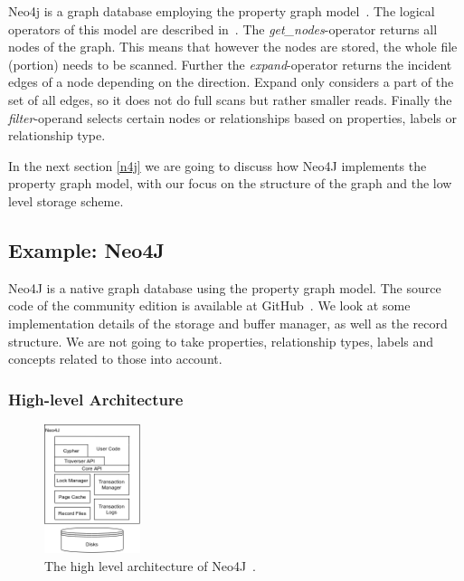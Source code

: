         
        Neo4j is a graph database employing the property graph model~\cite{robinson2015graph}.
        The logical operators of this model are described in~\autocite{Holsch2016Algeb}. 
        The \textit{get\_nodes}-operator returns all nodes of the graph.
        This means that however the nodes are stored, the whole file (portion) needs to be scanned.
        Further the \textit{expand}-operator returns the incident edges of a node depending on the direction.
        Expand only considers a part of the set of all edges, so it does not do full scans but rather smaller reads.
        Finally the \textit{filter}-operand selects certain nodes or relationships based on properties, labels or relationship type.
        
        In the next section \ref{n4j} we are going to discuss how Neo4J implements the property graph model, with our focus on the structure of the graph and the low level storage scheme.

    \subsection*{Example: Neo4J}\label{n4j}
        Neo4J is a native graph database using the property graph model.
        The source code of the community edition is available at GitHub~\autocite{GitHubneo4j}.
        We look at some implementation details of the storage and buffer manager, as well as the record structure.
        We are not going to take properties, relationship types, labels and concepts related to those into account.
        
        \subsubsection*{High-level Architecture}
        \begin{figure}[htp]
            \begin{center}
                \includegraphics[keepaspectratio,width=0.25\textwidth]{img/03-preliminaries/N4J_HLA_Emil.png}
            \end{center}
            \caption{The high level architecture of Neo4J~\autocite{robinson2015graph}.} 
            \label{N4J_HLA_Emil}
        \end{figure}
        

